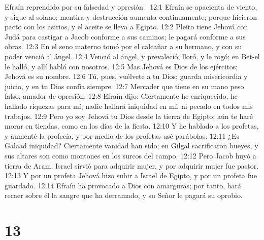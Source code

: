 Efraín reprendido por su falsedad y opresión  

12:1 Efraín se apacienta de viento, y sigue al solano; mentira y destrucción aumenta continuamente; porque hicieron pacto con los asirios, y el aceite se lleva a Egipto.  
12:2 Pleito tiene Jehová con Judá para castigar a Jacob conforme a sus caminos; le pagará conforme a sus obras.  
12:3 En el seno materno tomó por el calcañar a su hermano, y con su poder venció al ángel.  
12:4 Venció al ángel, y prevaleció; lloró, y le rogó; en Bet-el le halló, y allí habló con nosotros.  
12:5 Mas Jehová es Dios de los ejércitos; Jehová es su nombre.  
12:6 Tú, pues, vuélvete a tu Dios; guarda misericordia y juicio, y en tu Dios confía siempre.  
12:7 Mercader que tiene en su mano peso falso, amador de opresión,  
12:8 Efraín dijo: Ciertamente he enriquecido, he hallado riquezas para mí; nadie hallará iniquidad en mí, ni pecado en todos mis trabajos.  
12:9 Pero yo soy Jehová tu Dios desde la tierra de Egipto; aún te haré morar en tiendas, como en los días de la fiesta. 
12:10 Y he hablado a los profetas, y aumenté la profecía, y por medio de los profetas usé parábolas.  
12:11 ¿Es Galaad iniquidad? Ciertamente vanidad han sido; en Gilgal sacrificaron bueyes, y sus altares son como montones en los surcos del campo.  
12:12 Pero Jacob huyó a tierra de Aram, Israel sirvió para adquirir mujer, y por adquirir mujer fue pastor. 
12:13 Y por un profeta Jehová hizo subir a Israel de Egipto, y por un profeta fue guardado. 
12:14 Efraín ha provocado a Dios con amarguras; por tanto, hará recaer sobre él la sangre que ha derramado, y su Señor le pagará su oprobio.  

\chapter{13}


